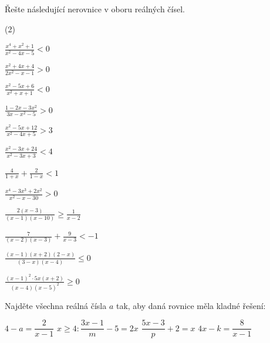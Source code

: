 \documentclass[12pt,a4paper]{article}
\begin{document}
\begin{exercise}
Řešte následující nerovnice v oboru reálných čísel.

\begin{tasks}(2)

\task \(\displaystyle \frac{x^4 + x^2 + 1}{x^2 - 4x - 5} < 0\)

\task \(\displaystyle \frac{x^2 + 4x + 4}{2x^2 - x - 1} > 0\)

\task \(\displaystyle \frac{x^2 - 5x + 6}{x^2 + x + 1} < 0\)

\task \(\displaystyle \frac{1 - 2x - 3x^2}{3x - x^2 - 5} > 0\)

\task \(\displaystyle \frac{x^2 - 5x + 12}{x^2 - 4x + 5} > 3\)

\task \(\displaystyle \frac{x^2 - 3x + 24}{x^2 - 3x + 3} < 4\)

\task \(\displaystyle \frac{4}{1 + x} + \frac{2}{1 - x} < 1\)

\task \(\displaystyle \frac{x^4 - 3x^3 + 2x^2}{x^2 - x - 30} > 0\)

\task \(\displaystyle \frac{2(x - 3)}{(x - 1)(x - 10)} \ge \frac{1}{x - 2}\)

\task \(\displaystyle \frac{7}{(x - 2)(x - 3)} + \frac{9}{x - 3} < -1\)

\task \(\displaystyle \frac{(x - 1)(x + 2)(2 - x)}{(3 - x)(x - 4)} \le 0\)

\task \(\displaystyle \frac{(x - 1)^2 \cdot 5x (x + 2)}{(x - 4)(x - 5)^2} \ge 0\)

\end{tasks}

\end{exercise}



\begin{exercise}
Najděte všechna reálná čísla \(a\) tak, aby daná rovnice měla kladné řešení:
\begin{tasks}
  \task $ 4 - a = \dfrac{2}{x - 1}$
  \task $ x \geq 4:\dfrac{3x - 1}{m} - 5 = 2x$
  \task $ \dfrac{5x - 3}{p} + 2 = x$
  \task $ 4x - k = \dfrac{8}{x - 1}$
\end{tasks}
\end{exercise}
\end{document}
